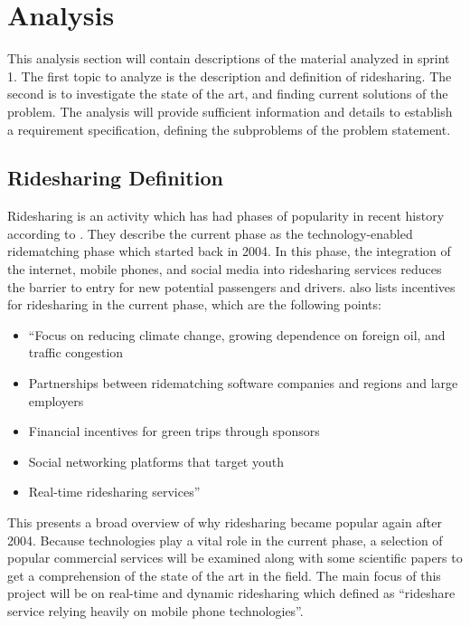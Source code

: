 \section{Analysis}\label{s:s1anal}
This analysis section will contain descriptions of the material analyzed in sprint 1.
The first topic to analyze is the description and definition of ridesharing.
The second is to investigate the state of the art, and finding current solutions of the problem.
The analysis will provide sufficient information and details to establish a requirement specification, defining the subproblems of the problem statement. 

\subsection{Ridesharing Definition}
Ridesharing is an activity which has had phases of popularity in recent history according to \citet{doi:10.1080/01441647.2011.621557}.
They describe the current phase as the technology-enabled ridematching phase which started back in 2004.
In this phase, the integration of the internet, mobile phones, and social media into ridesharing services reduces the barrier to entry for new potential passengers and drivers.
\citet{doi:10.1080/01441647.2011.621557} also lists incentives for ridesharing in the current phase, which are the following points:

\begin{itemize}
	\item ``Focus on reducing climate change, growing dependence on foreign oil, and traffic congestion
	\item Partnerships between ridematching software companies and regions and large employers
	\item Financial incentives for green trips through sponsors
	\item Social networking platforms that target youth
	\item Real-time ridesharing services''
\end{itemize}

This presents a broad overview of why ridesharing became popular again after 2004.
Because technologies play a vital role in the current phase, a selection of popular commercial services will be examined along with some scientific papers to get a comprehension of the state of the art in the field.
The main focus of this project will be on real-time and dynamic ridesharing which \citet{amey2011real} defined as ``rideshare service relying heavily on mobile phone technologies''.

